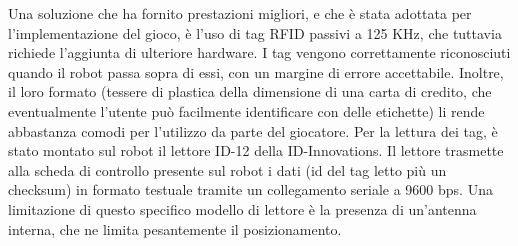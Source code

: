 Una soluzione che ha fornito prestazioni migliori, e che è stata adottata per l'implementazione del gioco, è l'uso di tag RFID passivi a 125 KHz, che tuttavia richiede l'aggiunta di ulteriore hardware. I tag vengono correttamente riconosciuti quando il robot passa sopra di essi, con un margine di errore accettabile. Inoltre, il loro formato (tessere di plastica della dimensione di una carta di credito, che eventualmente l'utente può facilmente identificare con delle etichette) li rende abbastanza comodi per l'utilizzo da parte del giocatore. Per la lettura dei tag, è stato montato sul robot il lettore ID-12 della ID-Innovations. Il lettore trasmette alla scheda di controllo presente sul robot i dati (id del tag letto più un checksum) in formato testuale tramite un collegamento seriale a 9600 bps. Una limitazione di questo specifico modello di lettore è la presenza di un'antenna interna, che ne limita pesantemente il posizionamento.